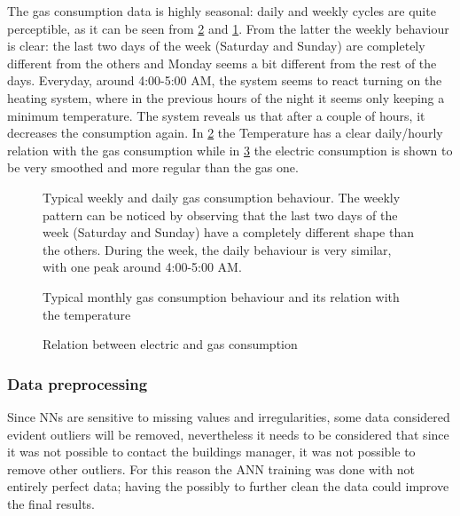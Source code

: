\documentclass{sig-alternate-sigmod07}
\begin{document}
The gas consumption data is highly seasonal: daily and weekly cycles are quite perceptible, as it can be seen from \cref{fig:monthlyTGas} and \cref{fig:dailyBehaviour}. From the latter the weekly behaviour is clear: the last two days of the week (Saturday and Sunday) are completely different from the others and Monday seems a bit different from the rest of the days. Everyday, around 4:00-5:00 AM, the system seems to react turning on the heating system, where in the previous hours of the night it seems only keeping a minimum temperature. The system reveals us that after a couple of hours, it decreases the consumption again.
In \cref{fig:monthlyTGas} the Temperature has a clear daily/hourly relation with the gas consumption while in \cref{fig:monthlyGasElectr} the electric consumption is shown to be very smoothed and more regular than the gas one.


\begin{figure}[h!]
\centering
{}
\caption{Typical weekly and daily gas consumption behaviour. The weekly pattern can be noticed by observing that the last two days of the week (Saturday and Sunday) have a completely different shape than the others. During the week, the daily behaviour is very similar, with one peak around 4:00-5:00 AM.}
\label{fig:dailyBehaviour}
\end{figure}

\begin{figure}[h!]
\centering
{}
\caption{Typical monthly gas consumption behaviour and its relation with the temperature}
\label{fig:monthlyTGas}
\end{figure}

\begin{figure}[h!]
\centering
{}
\caption{Relation between electric and gas consumption}
\label{fig:monthlyGasElectr}
\end{figure}


\subsubsection{Data preprocessing}
\label{sec:datapreprocessing}

Since NNs are sensitive to missing values and irregularities, some data considered evident outliers will be removed, nevertheless it needs to be considered that since it was not possible to contact the buildings manager, it was not possible to remove other outliers. For this reason the ANN training was done with not entirely perfect data; having the possibly to further clean the data could improve the final results.
\end{document}

